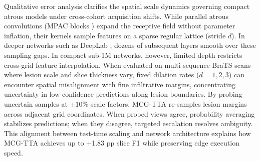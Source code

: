 Qualitative error analysis clarifies the spatial scale dynamics governing compact atrous models under cross-cohort acquisition shifts. While parallel atrous convolutions (MPAC blocks \cite{16}) expand the receptive field without parameter inflation, their kernels sample features on a sparse regular lattice (stride $d$). In deeper networks such as DeepLab \cite{5}, dozens of subsequent layers smooth over these sampling gaps. In compact sub-1M networks, however, limited depth restricts cross-grid feature interpolation. When evaluated on multi-sequence BraTS scans where lesion scale and slice thickness vary, fixed dilation rates ($d=1, 2, 3$) can encounter spatial misalignment with fine infiltrative margins, concentrating uncertainty in low-confidence predictions along lesion boundaries. By probing uncertain samples at $\pm 10\%$ scale factors, MCG-TTA re-samples lesion margins across adjacent grid coordinates. When probed views agree, probability averaging stabilizes predictions; when they disagree, targeted escalation resolves ambiguity. This alignment between test-time scaling and network architecture explains how MCG-TTA achieves up to +1.83 pp slice F1 while preserving edge execution speed.


